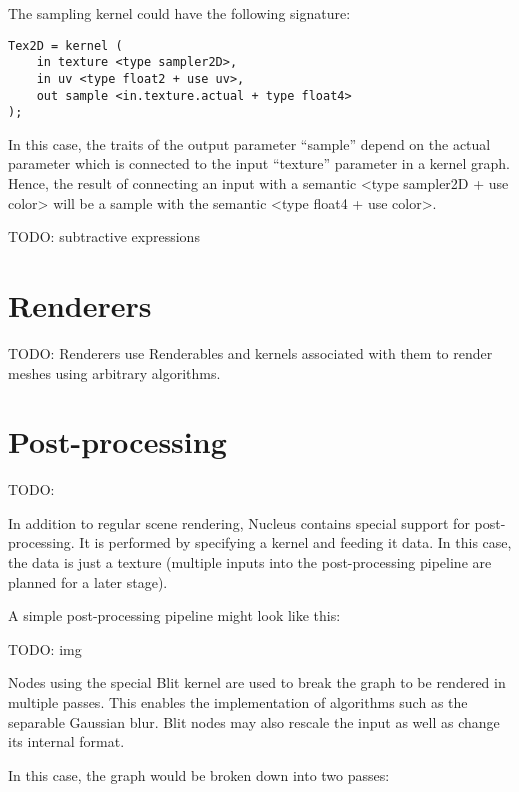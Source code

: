 The sampling kernel could have the following signature:

\begin{lstlisting}[frame=single]
Tex2D = kernel (
    in texture <type sampler2D>,
    in uv <type float2 + use uv>,
    out sample <in.texture.actual + type float4>
);
\end{lstlisting}


In this case, the traits of the output parameter ``sample'' depend on the actual parameter which is connected to the input ``texture'' parameter in a kernel graph. Hence, the result of connecting an input with a semantic <type sampler2D + use color> will be a sample with the semantic <type float4 + use color>.

TODO: subtractive expressions

\section{Renderers}

TODO: Renderers use Renderables and kernels associated with them to render meshes using arbitrary algorithms.

\section{Post-processing}


TODO:

In addition to regular scene rendering, Nucleus contains special support for post-processing. It is performed by specifying a kernel and feeding it data. In this case, the data is just a texture (multiple inputs into the post-processing pipeline are planned for a later stage).

A simple post-processing pipeline might look like this:

TODO: img

Nodes using the special Blit kernel are used to break the graph to be rendered in multiple passes. This enables the implementation of algorithms such as the separable Gaussian blur. Blit nodes may also rescale the input as well as change its internal format.

In this case, the graph would be broken down into two passes:
	
